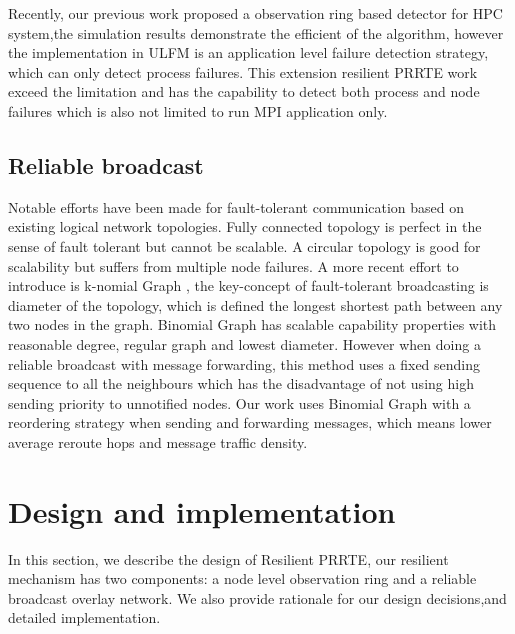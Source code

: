 \documentclass[sigconf]{acmart}
\begin{document}
Recently, our previous work \cite{George16} proposed a observation ring based detector for HPC system,the simulation results demonstrate the efficient of the algorithm, however the implementation in ULFM is an application level failure detection strategy, which can only detect process failures. This extension resilient PRRTE work exceed the limitation and has the capability to detect both process and node failures which is also not limited to run MPI application only. 

\subsection{Reliable broadcast}
Notable efforts have been made for fault-tolerant communication based on existing logical network topologies. Fully connected topology is perfect in the sense of fault tolerant but cannot be scalable. A circular topology is good for scalability but suffers from multiple node failures.  
A more recent effort to introduce is k-nomial Graph \cite{Angskun07}\cite{Pava11}, the key-concept of fault-tolerant broadcasting is diameter of the topology, which is defined the longest shortest path between any two nodes in the graph. Binomial Graph has scalable capability properties with reasonable degree, regular graph and lowest diameter. However when doing a reliable broadcast with message forwarding, this method uses a fixed sending sequence to all the neighbours which has the disadvantage of not using high sending priority to unnotified nodes. Our work uses Binomial Graph with a reordering strategy when sending and forwarding messages, which means lower average reroute hops and message traffic density.

\section{Design and implementation}

In this section, we describe the design of Resilient PRRTE, our resilient mechanism has two components: a node level observation ring and a reliable broadcast overlay network. We also provide rationale for our design decisions,and detailed implementation.
\end{document}
